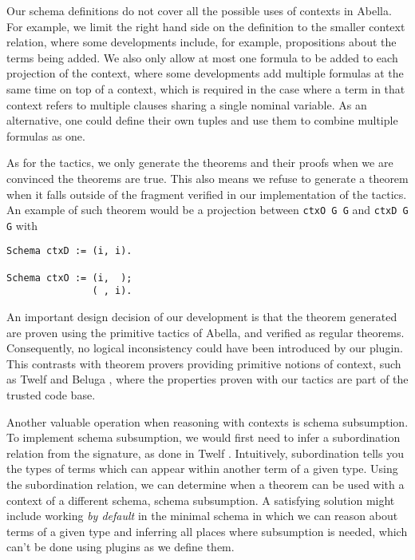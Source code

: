 \documentclass[nocopyrightspace,authoryear]{sigplanconf}
\begin{document}
Our schema definitions do not cover all the possible uses of contexts in Abella. 
For example, we limit the right hand side on the definition to the smaller context relation, where some developments include, for example, propositions about the terms being added. We also only allow at most one formula to be added to each projection of the context, where some developments add multiple formulas at the same time on top of a context, which is required in the case where a term in that context refers to multiple clauses sharing a single nominal variable. As an alternative, one could define their own tuples and use them to combine multiple formulas as one. 
 
As for the tactics, we only generate the theorems and their proofs when we are convinced the theorems are true. This also means we refuse to generate a theorem when it falls outside of the fragment verified in our implementation of the tactics. An example of such theorem would be a projection between \lstinline|ctxO G G| and  \lstinline|ctxD G G| with
\begin{lstlisting}
Schema ctxD := (i, i).

Schema ctxO := (i,  );
               ( , i).
\end{lstlisting}
An important design decision of our development is that the theorem generated are proven using the primitive tactics of Abella, and verified as regular theorems. Consequently, no logical inconsistency could have been introduced by our plugin. This contrasts with theorem provers providing primitive notions of context, such as Twelf \cite{twelfsys} and Beluga \cite{belugasys}, where the properties proven with our tactics are part of the trusted code base.

Another valuable operation when reasoning with contexts is schema subsumption. To implement schema subsumption, we would first need to infer a subordination relation from the signature, as done in Twelf \cite{twelfsys}. Intuitively, subordination tells you the types of terms which can appear within another term of a given type. Using the subordination relation, we can determine when a theorem can be used with a context of a different schema, schema subsumption. A satisfying solution might include working \emph{by default} in the minimal schema in which we can reason about terms of a given type and inferring all places where subsumption is needed, which can't be done using plugins as we define them.
\end{document}
